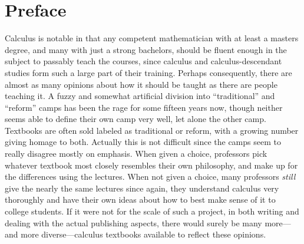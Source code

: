 \chapter{Preface}





Calculus is  notable in that any competent mathematician
with at least a masters  degree, and many with just a strong bachelors,
should be fluent enough in the subject to passably teach the courses, since
calculus and calculus-descendant studies form such a large
part of their training.  Perhaps consequently, there are almost as
many opinions about how it should be taught as there are
people teaching it.  A fuzzy and somewhat artificial division
into ``traditional'' and ``reform'' camps has been 
the rage for some fifteen years now, though neither seems
able to define their own camp very well, let alone the other camp.
Textbooks are often sold labeled as traditional or
reform, with a growing number giving homage
to both. Actually this is not difficult since the camps
seem to really disagree mostly on emphasis.  When given
a choice, professors pick whatever textbook most closely
resembles their own philosophy, and make up for the differences
using the lectures.  When not given a choice,
many professors {\it still}  give the nearly the
same lectures since again, they
understand calculus very thoroughly and have their own ideas
about how to best make sense of it to college students.
If it were not for the scale of such a project, in both writing
and dealing with the actual publishing aspects,
there would surely be many more---and more diverse---calculus 
textbooks available to reflect these opinions.

